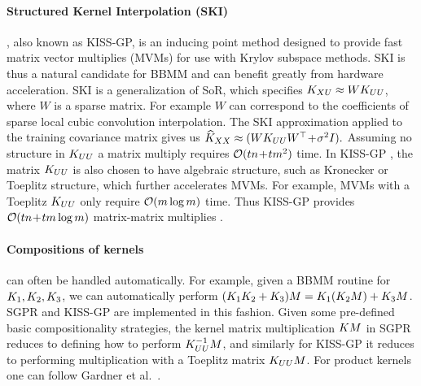 \paragraph{Structured Kernel Interpolation (SKI)} \cite{wilson2015kernel}, also known as KISS-GP, is an inducing point method designed to provide fast matrix vector multiplies (MVMs) for use with Krylov subspace methods. SKI is thus a natural candidate for BBMM and can benefit greatly from hardware acceleration.
SKI is a generalization of SoR, which specifies $K_{XU} \approx WK_{UU}$, where $W$ is a sparse matrix. For example $W$ can correspond to the coefficients of sparse local cubic convolution interpolation.
The SKI approximation applied to the training covariance matrix gives us
$
\widehat{K}_{XX} \approx (WK_{UU}W^{\top} \! + \! \sigma^{2}I).
$
Assuming no structure in $K_{UU}$ a matrix multiply requires $\bigo{tn \! + \! tm^{2}}$ time. In KISS-GP \citep{wilson2015kernel,wilson2015thoughts}, the matrix $K_{UU}$ is also chosen to have algebraic structure, such as Kronecker or Toeplitz structure, which further accelerates MVMs. For example, MVMs with a Toeplitz $K_{UU}$ only require $\bigo{m \log m}$ time. Thus KISS-GP
provides $\bigo{tn \! + \! tm \log m}$ matrix-matrix multiplies \cite{wilson2015kernel}.

\paragraph{Compositions of kernels} can often be handled automatically.
For example, given a BBMM routine for $K_{1},K_{2},K_{3}$, we can automatically perform $(K_{1}K_{2}+K_{3})M = K_{1}(K_{2}M) + K_{3}M$.
SGPR and KISS-GP are implemented in this fashion. Given some pre-defined basic compositionality strategies, the kernel matrix multiplication $KM$ in SGPR reduces to defining how to perform $K_{UU}^{-1}M$, and similarly for KISS-GP it reduces to performing multiplication with a Toeplitz matrix $K_{UU}M$. For product kernels one can follow Gardner et al.~\cite{gardner2018product}.
